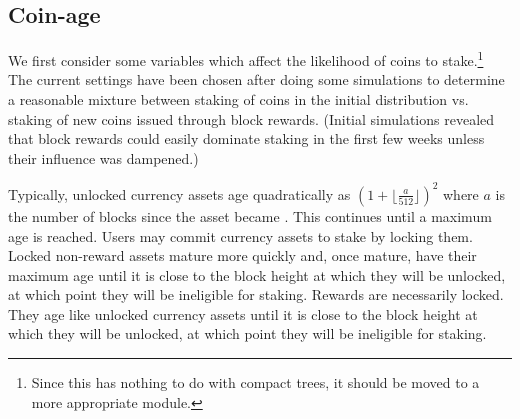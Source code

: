 \subsection{Coin-age}

We first consider some variables which affect the likelihood of
coins to stake.\footnote{Since this has nothing to do with compact trees, it should be moved to a more appropriate module.}
The current settings have been chosen after
doing some simulations to determine a reasonable mixture
between staking of coins in the initial distribution
vs. staking of new coins issued through block rewards.
(Initial simulations revealed that block rewards could
easily dominate staking in the first few weeks unless their
influence was dampened.)

Typically, unlocked currency assets age quadratically as $(1+\lfloor\frac{a}{512}\rfloor)^2$ where $a$ is the number of blocks
since the asset became {}. This continues until a maximum age is reached.
Users may commit currency assets to stake by locking them.
Locked non-reward assets mature more quickly and, once mature, have their maximum age
until it is close to the block height at which they will be unlocked, at which point
they will be ineligible for staking.
Rewards are necessarily locked. They age like unlocked currency assets until it is close to
the block height at which they will be unlocked, at which point they will be ineligible for staking.

